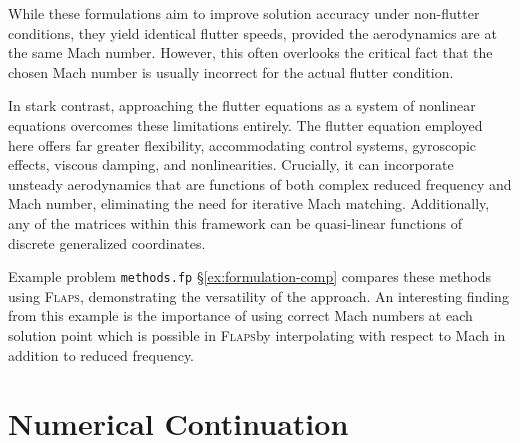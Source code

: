 \documentclass[10pt,openany,twoside]{book}
\numberwithin{equation}{section}   %
\newcommand{\Code}[1]{{\small\tt #1}}
\newcommand{\Flaps}{{\normalfont\scshape Flaps\:}}
\newcommand{\Sectref}[1]{\S\ref{#1}}
\begin{document}
While these formulations aim to improve solution accuracy under
non-flutter conditions, they yield identical flutter speeds, provided the
aerodynamics are at the same Mach number. However, this often overlooks
the critical fact that the chosen Mach number is usually incorrect for
the actual flutter condition.

In stark contrast, approaching the flutter equations as a system
of nonlinear equations overcomes these limitations entirely. The
flutter equation employed here offers far greater flexibility,
accommodating control systems, gyroscopic effects, viscous damping,
and nonlinearities. Crucially, it can incorporate unsteady aerodynamics
that are functions of both complex reduced frequency and Mach number,
eliminating the need for iterative Mach matching. Additionally, any
of the matrices within this framework can be quasi-linear functions of
discrete generalized coordinates.

Example problem \Code{methods.fp} \Sectref{ex:formulation-comp}
compares these methods using \Flaps,
demonstrating the versatility of the approach. An interesting finding from
this example is the importance of using correct Mach numbers at each solution
point which is possible in \Flaps by interpolating with respect to Mach in
addition to reduced frequency.

\newpage
\chapter{Numerical Continuation}\label{chap:continuation}
\end{document}
